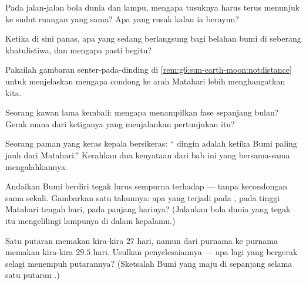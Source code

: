 \begin{exercise}[$\star$]\label{exo:g6:sun-earth-moon:5}
Pada jalan-jalan bola dunia dan lampu, mengapa tusuknya harus terus
menunjuk ke sudut ruangan yang sama? Apa yang rusak kalau ia berayun?
\end{exercise}

\begin{exercise}[$\star$]\label{exo:g6:sun-earth-moon:6}
Ketika di sini  panas,  apa yang sedang berlangsung bagi
belahan bumi di seberang khatulistiwa, dan mengapa pasti begitu?
\end{exercise}

\begin{exercise}[$\star$]\label{exo:g6:sun-earth-moon:7}
Pakailah gambaran senter-pada-dinding di
\cref{rem:g6:sun-earth-moon:notdistance} untuk menjelaskan mengapa
condong ke arah Matahari lebih menghangatkan kita.
\end{exercise}

\begin{exercise}[$\star$]\label{exo:g6:sun-earth-moon:8}
Seorang kawan lama kembali: mengapa  menampilkan fase sepanjang
bulan? Gerak mana dari ketiganya yang menjalankan pertunjukan itu?
\end{exercise}

\begin{exercise}[$\star\star$]\label{exo:g6:sun-earth-moon:9}
Seorang paman yang keras kepala bersikeras: `` dingin adalah
ketika Bumi paling jauh dari Matahari.'' Kerahkan dua kenyataan dari
bab ini yang bersama-sama mengalahkannya.
\end{exercise}

\begin{exercise}[$\star\star$]\label{exo:g6:sun-earth-moon:10}
Andaikan  Bumi berdiri tegak lurus sempurna terhadap  ---
tanpa kecondongan sama sekali. Gambarkan satu tahunnya: apa yang
terjadi pada , pada tinggi Matahari tengah hari, pada panjang
harinya? (Jalankan bola dunia yang tegak itu mengelilingi lampunya di
dalam kepalamu.)
\end{exercise}

\begin{exercise}[$\star\star$]\label{exo:g6:sun-earth-moon:11}
Satu putaran  memakan kira-kira $27$ hari, namun dari purnama ke
purnama memakan kira-kira $29.5$ hari. Usulkan penyelesaiannya --- apa
lagi yang bergerak selagi  menempuh putarannya? (Sketsalah Bumi
yang maju di sepanjang  selama satu putaran .)
\end{exercise}

